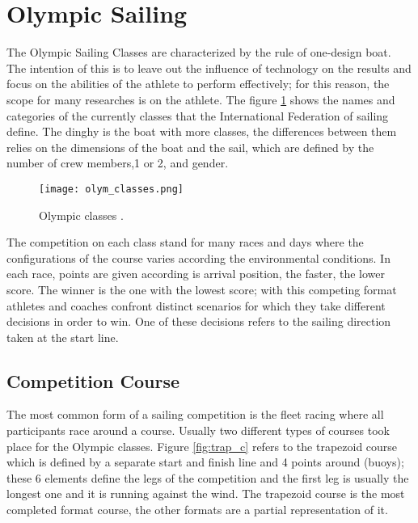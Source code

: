 \section {Olympic Sailing} \label{sec:olympic classes}
The Olympic Sailing Classes are characterized by the rule of one-design boat. The intention of this is to leave out the influence of technology on the results and focus on the abilities of the athlete to perform effectively; for this reason, the scope for many researches is on the athlete. The figure \ref{fig:olymp_cla} shows the names and categories of the currently classes that the International Federation of sailing define. The dinghy is the boat with more classes, the differences between them relies on the dimensions of the boat and the sail, which are defined by the number of crew members,1 or 2, and gender. \\

\begin{figure}[ht]
\centering
 \texttt{[image: olym\_classes.png]}
  \caption{Olympic classes \cite{sailoly}.}
\label{fig:olymp_cla} 
\end{figure}

The competition on each class stand for many races and days where the configurations of the course varies according the environmental conditions. In each race, points are given according is arrival position, the faster, the lower score. The winner is the one with the lowest score; with this competing format athletes and coaches confront distinct scenarios for which they take different decisions in order to win. One of these decisions refers to the sailing direction taken at the start line. \\

\subsection{Competition Course}\label{tracks}
The most common form of a sailing competition is the fleet racing where all participants race around a course. Usually two different types of courses took place for the Olympic classes. Figure \ref{fig:trap_c} refers to the trapezoid course which is defined by a separate start and finish line and 4 points around (buoys); these 6 elements define the legs of the competition and the first leg is usually the longest one and it is running against the wind.
The trapezoid course is the most completed format course, the other formats are a partial representation of it.\\

